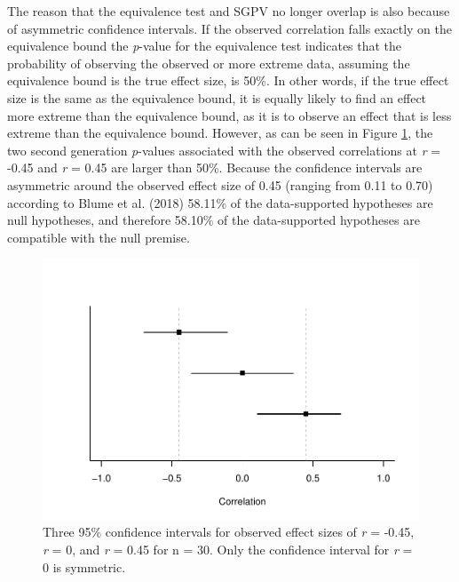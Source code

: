 \documentclass[,man,floatsintext]{apa6}
\begin{document}
The reason that the equivalence test and SGPV no longer overlap is also
because of asymmetric confidence intervals. If the observed correlation
falls exactly on the equivalence bound the \emph{p}-value for the
equivalence test indicates that the probability of observing the
observed or more extreme data, assuming the equivalence bound is the
true effect size, is 50\%. In other words, if the true effect size is
the same as the equivalence bound, it is equally likely to find an
effect more extreme than the equivalence bound, as it is to observe an
effect that is less extreme than the equivalence bound. However, as can
be seen in Figure \ref{fig:TOSTSGPV12}, the two second generation
\emph{p}-values associated with the observed correlations at \emph{r} =
-0.45 and \emph{r} = 0.45 are larger than 50\%. Because the confidence
intervals are asymmetric around the observed effect size of 0.45
(ranging from 0.11 to 0.70) according to Blume et al. (2018) 58.11\% of
the data-supported hypotheses are null hypotheses, and therefore 58.10\%
of the data-supported hypotheses are compatible with the null premise.

\begin{figure}
\centering
\includegraphics{manuscript.R1_files/figure-latex/TOSTSGPV12-1.pdf}
\caption{\label{fig:TOSTSGPV12}Three 95\% confidence intervals for observed
effect sizes of \emph{r} = -0.45, \emph{r} = 0, and \emph{r} = 0.45 for
n = 30. Only the confidence interval for \emph{r} = 0 is symmetric.}
\end{figure}
\end{document}
